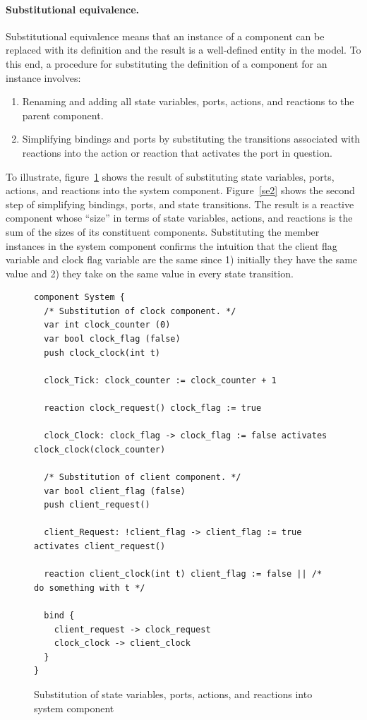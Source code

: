 \paragraph{Substitutional equivalence.}
Substitutional equivalence means that an instance of a component can be replaced with its definition and the result is a well-defined entity in the model.
To this end, a procedure for substituting the definition of a component for an instance involves:
\begin{enumerate}
\item Renaming and adding all state variables, ports, actions, and reactions to the parent component.
\item Simplifying bindings and ports by substituting the transitions associated with reactions into the action or reaction that activates the port in question.
\end{enumerate}
To illustrate, figure~\ref{se1} shows the result of substituting state variables, ports, actions, and reactions into the system component.
Figure~\ref{se2} shows the second step of simplifying bindings, ports, and state transitions.
The result is a reactive component whose ``size'' in terms of state variables, actions, and reactions is the sum of the sizes  of its constituent components.
Substituting the member instances in the system component confirms the intuition that the client flag variable and clock flag variable are the same since 1) initially they have the same value and 2) they take on the same value in every state transition.

\begin{figure}
\begin{verbatim}
component System {
  /* Substitution of clock component. */
  var int clock_counter (0)
  var bool clock_flag (false)
  push clock_clock(int t)

  clock_Tick: clock_counter := clock_counter + 1

  reaction clock_request() clock_flag := true

  clock_Clock: clock_flag -> clock_flag := false activates clock_clock(clock_counter)

  /* Substitution of client component. */
  var bool client_flag (false)
  push client_request()

  client_Request: !client_flag -> client_flag := true activates client_request()

  reaction client_clock(int t) client_flag := false || /* do something with t */

  bind {
    client_request -> clock_request
    clock_clock -> client_clock
  }
}
\end{verbatim}
\caption{Substitution of state variables, ports, actions, and reactions into system component\label{se1}}
\end{figure}

